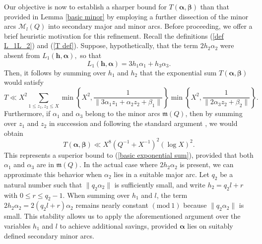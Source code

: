 \documentclass{amsart}%
\numberwithin{equation}{section}
\theoremstyle{remark}
\newcommand{\bh}{{\boldsymbol h}}
\newcommand{\1}{\mathbbm{1}}
\begin{document}
Our objective is now to establish a sharper bound for $T(\boldsymbol{\alpha},\boldsymbol{\beta})$ than that provided in Lemma \ref{basic minor} by employing a further dissection of the minor arcs 
 $\mathcal{M}_l(Q)$ into secondary major and minor arcs.
 Before proceeding, we offer a brief heuristic motivation for this refinement. 
 Recall the definitions (\ref{def L_1L_2}) and (\ref{T def}).
Suppose, hypothetically, that the term $2h_2\alpha_2$ were absent from $L_1(\boldsymbol{h},\boldsymbol{\alpha}),$ so that
\begin{equation*}
L_1(\boldsymbol{h},\boldsymbol{\alpha}) =3h_1 \alpha_1 + h_3\alpha_3.
\end{equation*}
Then, it follows by summing over $h_1$ and $h_2$ that the exponential sum $T(\boldsymbol{\alpha},\boldsymbol{\beta})$ would satisfy
\begin{equation*}
    T \ll X^2\sum_{1\leq z_1,z_2\leq X}\min\left\{X^2,\frac{1}{\|3\alpha_1z_1+\alpha_2z_2+\beta_1\|}\right\}\min\left\{X^2,\frac{1}{\|2\alpha_3z_2+\beta_2\|}\right\}.
\end{equation*}
Furthermore, if $\alpha_1$ and $\alpha_3$ belong to the minor arcs $\mathfrak{m}(Q)$, then by summing over $z_1$ and $z_2$ in succession and following the standard argument \cite[Lemma 3.2]{MR865981}, we would obtain
\begin{equation*}
T(\boldsymbol{\alpha},\boldsymbol{\beta})\ll X^{8}(Q^{-1}+X^{-1})^2(\log X)^2.
\end{equation*}
This represents a superior bound to (\ref{basic exponential sum}), provided that both $\alpha_1$ and $\alpha_3$ are in $\mathfrak{m}(Q).$
In the actual case where $2h_2\alpha_2$ is present, we can approximate this behavior when $\alpha_2$ lies in a suitable major arc. Let $q_2$ be a natural number such that $\|q_2\alpha_2\|$ is sufficiently small, and write $h_2=q_2l+r$ with $0\leq r\leq q_2-1$. When summing over $h_1$ and $l$, the term $2h_2\alpha_2=2(q_2l+r)\alpha_2$ remains nearly constant $(\text{mod}\ 1)$ because $\|q_2\alpha_2\|$ is small. This stability allows us to apply the aforementioned argument over the variables $h_1$
  and $l$ to achieve additional savings, provided $\boldsymbol{\alpha}$ lies on suitably defined secondary minor arcs.
\end{document}
